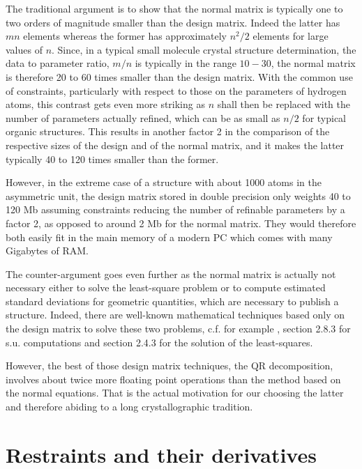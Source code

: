 \documentclass[pdf]{iucr}
\begin{document}
The traditional argument is to show that the normal matrix is typically one to two orders of magnitude smaller than the design matrix. Indeed the latter has $m n$ elements whereas the former has approximately $n^2/2$ elements for large values of $n$. Since, in a typical small molecule crystal structure determination, the data to parameter ratio, $m / n$ is typically in the range $10-30$, the normal matrix is therefore 20 to 60 times smaller than the design matrix. With the common use of constraints, particularly with respect to those on the parameters of hydrogen atoms, this contrast gets even more striking as $n$ shall then be replaced with the number of parameters actually refined, which can be as small as $n/2$ for typical organic structures. This results in another factor 2 in the comparison of the respective sizes of the design and of the normal matrix, and it makes the latter typically 40 to 120 times smaller than the former. 

However, in the extreme case of a structure with about 1000 atoms in the asymmetric unit, the design matrix stored in double precision only weights 40 to 120 Mb assuming constraints reducing the number of refinable parameters by a factor 2, as opposed to around 2 Mb for the normal matrix. They would therefore both easily fit in the main memory of a modern PC which comes with many Gigabytes of RAM.

The counter-argument goes even further as the normal matrix is actually not necessary either to solve the least-square problem or to compute estimated standard deviations for geometric quantities, which are necessary to publish a structure. Indeed, there are well-known mathematical techniques based only on the design matrix to solve these two problems, c.f. for example \cite{Bjorck:1996fk}, section 2.8.3 for s.u. computations and section 2.4.3 for the solution of the least-squares.
 
However, the best of those design matrix techniques, the QR decomposition, involves about twice more floating point operations than the method based on the normal equations. That is the actual motivation for our choosing the latter and therefore abiding to a long crystallographic tradition.

\section{Restraints and their derivatives}
\end{document}
